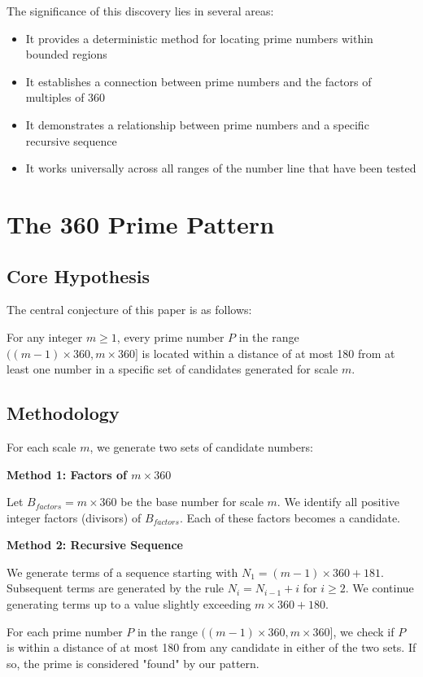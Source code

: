 \documentclass[conference]{IEEEtran}
\begin{document}
The significance of this discovery lies in several areas:
\begin{itemize}
\item It provides a deterministic method for locating prime numbers within bounded regions
\item It establishes a connection between prime numbers and the factors of multiples of 360
\item It demonstrates a relationship between prime numbers and a specific recursive sequence
\item It works universally across all ranges of the number line that have been tested
\end{itemize}

\section{The 360 Prime Pattern}

\subsection{Core Hypothesis}
The central conjecture of this paper is as follows:

For any integer $m \geq 1$, every prime number $P$ in the range $((m-1) \times 360, m \times 360]$ is located within a distance of at most 180 from at least one number in a specific set of candidates generated for scale $m$.

\subsection{Methodology}
For each scale $m$, we generate two sets of candidate numbers:

\textbf{Method 1: Factors of $m \times 360$}

Let $B_{factors} = m \times 360$ be the base number for scale $m$. We identify all positive integer factors (divisors) of $B_{factors}$. Each of these factors becomes a candidate.

\textbf{Method 2: Recursive Sequence}

We generate terms of a sequence starting with $N_1 = (m-1) \times 360 + 181$. Subsequent terms are generated by the rule $N_i = N_{i-1} + i$ for $i \geq 2$. We continue generating terms up to a value slightly exceeding $m \times 360 + 180$.

For each prime number $P$ in the range $((m-1) \times 360, m \times 360]$, we check if $P$ is within a distance of at most 180 from any candidate in either of the two sets. If so, the prime is considered "found" by our pattern.
\end{document}
